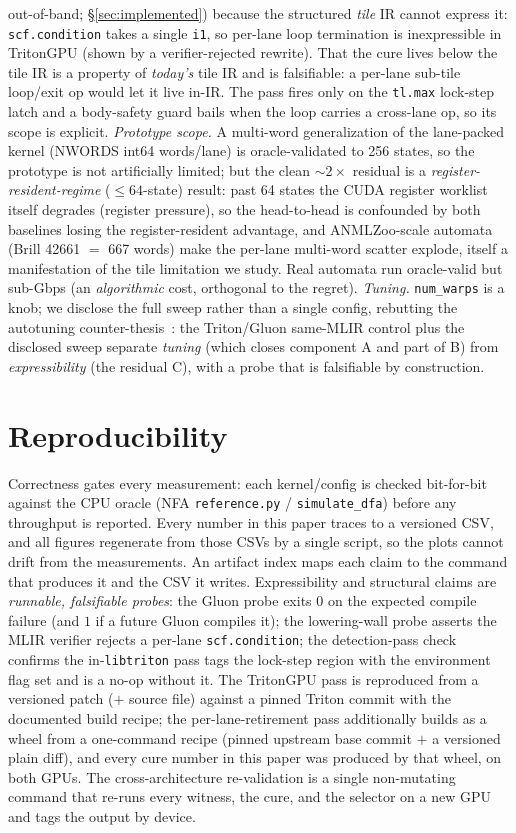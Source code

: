 \documentclass[sigplan,10pt]{acmart}
\begin{document}
out-of-band; \S\ref{sec:implemented}) because the structured \emph{tile} IR cannot express it:
\texttt{scf.condition} takes a single \texttt{i1}, so per-lane loop termination is inexpressible in
TritonGPU (shown by a verifier-rejected rewrite). That the cure lives below the tile IR is a property of
\emph{today's} tile IR and is falsifiable: a per-lane sub-tile loop/exit op would let it live in-IR. The
pass fires only on the \texttt{tl.max} lock-step latch and a body-safety guard bails when the loop carries
a cross-lane op, so its scope is explicit. \emph{Prototype scope.} A multi-word
generalization of the lane-packed kernel (NWORDS int64 words/lane) is oracle-validated to 256 states,
so the prototype is not artificially limited; but the clean ${\sim}2\times$ residual is a
\emph{register-resident-regime} ($\le 64$-state) result: past 64 states the CUDA register worklist
itself degrades (register pressure), so the head-to-head is confounded by both baselines losing the
register-resident advantage, and ANMLZoo-scale automata (Brill 42661 $=$ 667 words) make the per-lane
multi-word scatter explode, itself a manifestation of the tile limitation we study. Real automata run
oracle-valid but sub-Gbps (an \emph{algorithmic} cost, orthogonal to the regret). \emph{Tuning.} \texttt{num\_warps} is a knob; we
disclose the full sweep rather than a single config, rebutting the autotuning
counter-thesis~\cite{ringlein2025}: the Triton/Gluon same-MLIR control plus the disclosed sweep
separate \emph{tuning} (which closes component A and part of B) from \emph{expressibility} (the
residual C), with a probe that is falsifiable by construction.

\section{Reproducibility}
Correctness gates every measurement: each kernel/config is checked bit-for-bit against the CPU oracle
(NFA \texttt{reference.py} / \texttt{simulate\_dfa}) before any throughput is reported. Every number in
this paper traces to a versioned CSV, and all figures regenerate from those CSVs by a single script, so
the plots cannot drift from the measurements. An artifact index maps each claim to the command that
produces it and the CSV it writes. Expressibility and structural claims are \emph{runnable, falsifiable
probes}: the Gluon probe exits $0$ on the expected compile failure (and $1$ if a future Gluon compiles
it); the lowering-wall probe asserts the MLIR verifier rejects a per-lane \texttt{scf.condition}; the
detection-pass check confirms the in-\texttt{libtriton} pass tags the lock-step region with the
environment flag set and is a no-op without it. The TritonGPU pass is reproduced from a versioned patch
($+$ source file) against a pinned Triton commit with the documented build recipe; the
per-lane-retirement pass additionally builds as a wheel from a one-command recipe (pinned upstream
base commit $+$ a versioned plain diff), and every cure number in this paper was produced by that
wheel, on both GPUs. The
cross-architecture re-validation is a single non-mutating command that re-runs every witness, the cure,
and the selector on a new GPU and tags the output by device.
\end{document}
